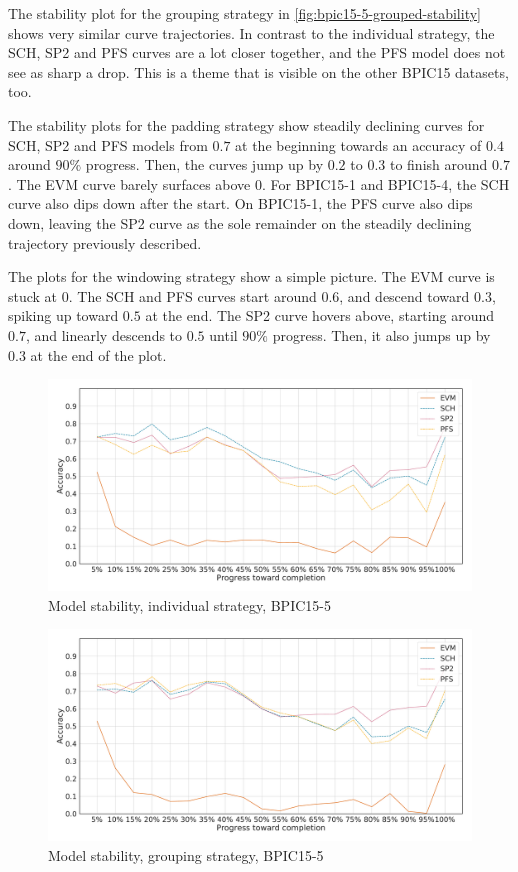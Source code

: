The stability plot for the grouping strategy in \autoref{fig:bpic15-5-grouped-stability} shows very similar curve trajectories.
In contrast to the individual strategy, the SCH, SP2 and PFS curves are a lot closer together, and the PFS model does not see as sharp a drop.
This is a theme that is visible on the other BPIC15 datasets, too.

The stability plots for the padding strategy show steadily declining curves for SCH, SP2 and PFS models from $0.7$ at the beginning towards an accuracy of $0.4$ around $90\%$ progress.
Then, the curves jump up by $0.2$ to $0.3$ to finish around $0.7$.
The EVM curve barely surfaces above $0$.
For BPIC15-1 and BPIC15-4, the SCH curve also dips down after the start.
On BPIC15-1, the PFS curve also dips down, leaving the SP2 curve as the sole remainder on the steadily declining trajectory previously described.

The plots for the windowing strategy show a simple picture.
The EVM curve is stuck at 0.
The SCH and PFS curves start around $0.6$, and descend toward $0.3$, spiking up toward $0.5$ at the end.
The SP2 curve hovers above, starting around $0.7$, and linearly descends to $0.5$ until $90\%$ progress.
Then, it also jumps up by $0.3$ at the end of the plot.

\begin{figure}[!htb]
    \centering
    \includegraphics[width=\textwidth]{gfx/bpic2015_5/individual_stability.pdf}
    \caption{Model stability, individual strategy, BPIC15-5}
    \label{fig:bpic15-5-individual-stability}
\end{figure}
\begin{figure}[!htb]
    \centering
    \includegraphics[width=\textwidth]{gfx/bpic2015_5/grouped_stability.pdf}
    \caption{Model stability, grouping strategy, BPIC15-5}
    \label{fig:bpic15-5-grouped-stability}
\end{figure}
\newpage
